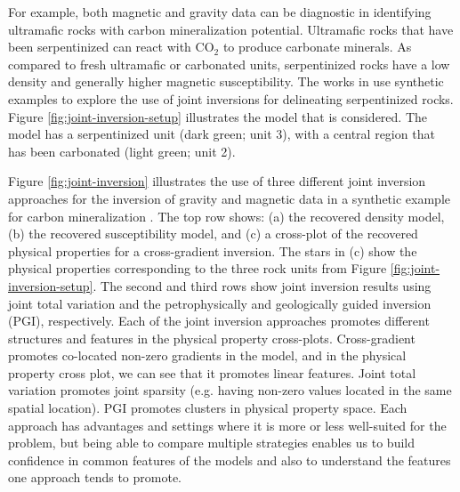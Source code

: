 For example, both magnetic and gravity data can be diagnostic in identifying ultramafic rocks with carbon mineralization potential. Ultramafic rocks that have been serpentinized can react with CO$_2$ to produce carbonate minerals. As compared to fresh ultramafic or carbonated units, serpentinized rocks have a low density and generally higher magnetic susceptibility. The works in \citep{capriotti_joint_2023, heagy_geophysical_2022} use synthetic examples to explore the use of joint inversions for delineating serpentinized rocks. Figure \ref{fig:joint-inversion-setup} illustrates the model that is considered. The model has a serpentinized unit (dark green; unit 3), with a central region that has been carbonated (light green; unit 2).



Figure \ref{fig:joint-inversion} illustrates the use of three different joint inversion approaches for the inversion of gravity and magnetic data in a synthetic example for carbon mineralization \citep{capriotti_joint_2023}. The top row shows: (a) the recovered density model, (b) the recovered susceptibility model, and (c) a cross-plot of the recovered physical properties for a cross-gradient inversion. The stars in (c) show the physical properties corresponding to the three rock units from Figure \ref{fig:joint-inversion-setup}. The second and third rows show joint inversion results using joint total variation and the petrophysically and geologically guided inversion (PGI), respectively. Each of the joint inversion approaches promotes different structures and features in the physical property cross-plots. Cross-gradient promotes co-located non-zero gradients in the model, and in the physical property cross plot, we can see that it promotes linear features. Joint total variation promotes joint sparsity (e.g. having non-zero values located in the same spatial location). PGI promotes clusters in physical property space. Each approach has advantages and settings where it is more or less well-suited for the problem, but being able to compare multiple strategies enables us to build confidence in common features of the models and also to understand the features one approach tends to promote.




